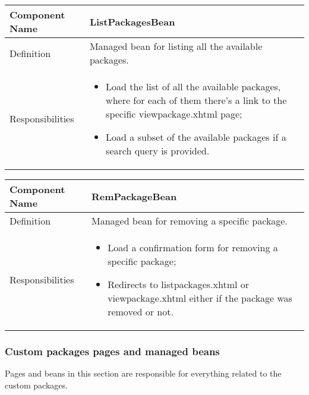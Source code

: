 \documentclass[a4paper,12pt]{book}
\begin{document}
            \begin{center}
              \begin{tabular}{ | p{3.3cm} | p{11.7cm} | }
                \hline
                Component Name & \textbf{ListPackagesBean} \\ \hline
                Definition & Managed bean for listing all the available packages. \\ \hline
                Responsibilities & \parbox{0.65\textwidth}{
                  \begin{itemize}[noitemsep,leftmargin=*]
                    \item Load the list of all the available packages, where for each of them there's a link to the specific viewpackage.xhtml page;
                    \item Load a subset of the available packages if a search query is provided.
                  \end{itemize}} \\ \hline
                \end{tabular}
              \end{center}
              \begin{center}
                \begin{tabular}{ | p{3.3cm} | p{11.7cm} | }
                  \hline
                  Component Name & \textbf{RemPackageBean} \\ \hline
                  Definition & Managed bean for removing a specific package. \\ \hline
                  Responsibilities & \parbox{0.65\textwidth}{
                    \begin{itemize}[noitemsep,leftmargin=*]
                      \item Load a confirmation form for removing a specific package;
                      \item Redirects to listpackages.xhtml or viewpackage.xhtml either if the package was removed or not.
                    \end{itemize}} \\ \hline
                  \end{tabular}
                \end{center}
  
\subsubsection{Custom packages pages and managed beans}
Pages and beans in this section are responsible for everything related to the custom packages.
\end{document}
